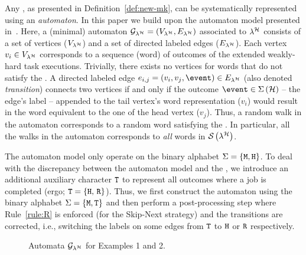 Any \ewhc{}, as presented in Definition~\ref{def:new-mk}, can be systematically represented using an \emph{automaton}.
In this paper we build upon the \tool{} automaton model presented in~{\cite{Vreman:2022}}.
Here, a (minimal) automaton $\mathcal{G}_{\lambda^{\mathcal{H}}} = \left(V_{\lambda^{\mathcal{H}}}, E_{\lambda^{\mathcal{H}}}\right)$ associated to $\lambda^{\mathcal{H}}$ consists of a set of vertices ($V_{\lambda^{\mathcal{H}}}$) and a set of directed labeled edges ($E_{\lambda^{\mathcal{H}}}$). 
Each vertex $v_i \in V_{\lambda^{\mathcal{H}}}$ corresponds to a sequence (word) of outcomes of the extended weakly-hard task executions. 
Trivially, there exists no vertices for words that do not satisfy the \ewhc{}.
A directed labeled edge $e_{i, j} = \left(v_i, v_j, \event \right) \in \EE{\lambda^\strat}$ (also denoted \emph{transition}) connects two vertices if and only if the outcome $\event \in \Sigma\left(\strat\right)$ -- the edge's label -- appended to the tail vertex's word representation ($v_i$) would result in the word equivalent to the one of the head vertex ($v_j$).
Thus, a random walk in the automaton corresponds to a random word satisfying the \ewhc{}.
In particular, all the walks in the automaton corresponds to \emph{all} words in $\mathcal{S}_{}\left( \lambda^{\mathcal{H}} \right)$.

The \tool{} automaton model only operate on the binary alphabet $\Sigma = \left\{\texttt{M}, \texttt{H}\right\}$. 
To deal with the discrepancy between the \tool{} automaton model and the \ewhc{}, we introduce an additional auxiliary character $\texttt{T}$ to represent all outcomes where a job is completed (ergo; $\texttt{T} = \left\{ \texttt{H},\, \texttt{R} \right\}$).
Thus, we first construct the automaton using the binary alphabet $\Sigma = \{\texttt{M}, \texttt{T}\}$ and then perform a post-processing step where Rule~\ref{rule:R} is enforced (for the Skip-Next strategy) and the transitions are corrected, i.e., switching the labels on some edges from $\texttt{T}$ to $\texttt{H}$ or $\texttt{R}$ respectively. 

\begin{figure}[t]
    \caption{Automata $\mathcal{G}_{\lambda^{\mathcal{H}}}$ for Examples 1 and 2.}
    \label{fig:min-graph}
\end{figure}


